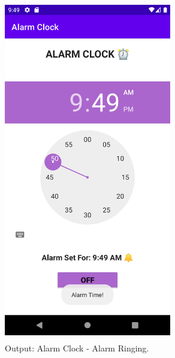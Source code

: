 \documentclass[12pt, a4]{article}
\begin{document}
\subsection*{}
\begin{figure}[h]
\centering
\caption{Output: Alarm Clock - Alarm Ringing.}
\includegraphics[height=15cm, width=7.3cm]{AlarmClock/Screenshots/Output-3.png}
\end{figure}

\newpage
\end{document}
